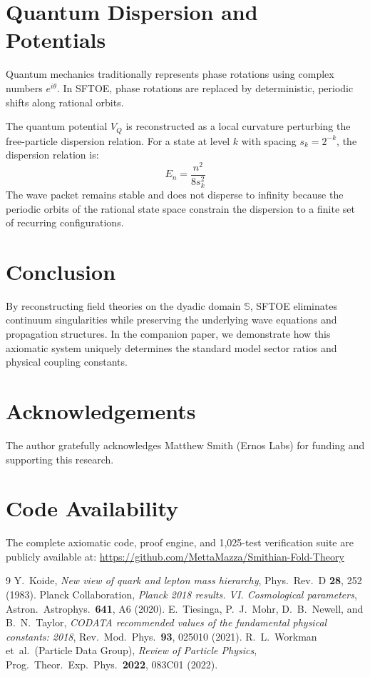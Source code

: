 \documentclass[11pt,a4paper]{article}
\begin{document}
\section{Quantum Dispersion and Potentials}
Quantum mechanics traditionally represents phase rotations using complex numbers $e^{i\theta}$. In SFTOE, phase rotations are replaced by deterministic, periodic shifts along rational orbits. 

The quantum potential $V_Q$ is reconstructed as a local curvature perturbing the free-particle dispersion relation. For a state at level $k$ with spacing $s_k = 2^{-k}$, the dispersion relation is:
\begin{equation}
E_n = \frac{n^2}{8 s_k^2}
\end{equation}
The wave packet remains stable and does not disperse to infinity because the periodic orbits of the rational state space constrain the dispersion to a finite set of recurring configurations.

\section{Conclusion}
By reconstructing field theories on the dyadic domain $\mathbb{S}$, SFTOE eliminates continuum singularities while preserving the underlying wave equations and propagation structures. In the companion paper, we demonstrate how this axiomatic system uniquely determines the standard model sector ratios and physical coupling constants.

\section*{Acknowledgements}
The author gratefully acknowledges Matthew Smith (Ernos Labs) for funding and supporting this research.

\section*{Code Availability}
The complete axiomatic code, proof engine, and 1,025-test verification suite are publicly available at:
\url{https://github.com/MettaMazza/Smithian-Fold-Theory}

\begin{thebibliography}{9}
 Y.~Koide, \textit{New view of quark and lepton mass hierarchy}, Phys.\ Rev.\ D \textbf{28}, 252 (1983).
 Planck Collaboration, \textit{Planck 2018 results. VI. Cosmological parameters}, Astron.\ Astrophys.\ \textbf{641}, A6 (2020).
 E.~Tiesinga, P.~J.~Mohr, D.~B.~Newell, and B.~N.~Taylor, \textit{CODATA recommended values of the fundamental physical constants: 2018}, Rev.\ Mod.\ Phys.\ \textbf{93}, 025010 (2021).
 R.~L.~Workman et~al.\ (Particle Data Group), \textit{Review of Particle Physics}, Prog.\ Theor.\ Exp.\ Phys.\ \textbf{2022}, 083C01 (2022).
\end{thebibliography}
\end{document}
